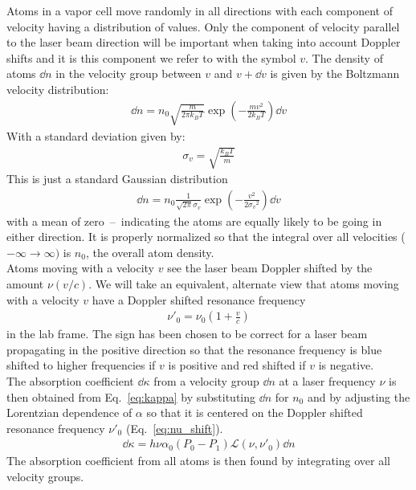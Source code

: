 Atoms in a vapor cell move randomly in all directions with each component of velocity having a distribution
of values. Only the component of velocity parallel to the laser beam direction will be important when taking
into account Doppler shifts and it is this component we refer to with the symbol \(v \). The density of atoms
\(\dd n \) in the velocity group between \(v \) and \(v+\dd v \) is given by the Boltzmann velocity
distribution:
\begin{align}
    \dd n = n_0 \sqrt{ \frac{m}{2\pi k_B T} } \exp{ \left( -\frac{mv^2}{2 k_B T} \right ) } \dd v
\end{align}
With a standard deviation given by:
\begin{align}
    \sigma_v = \sqrt{\frac{k_B T}{m}}
\end{align}
This is just a standard Gaussian distribution
\begin{align}
    \dd n = n_0 \frac{1}{\sqrt{2\pi}\sigma_v}  \exp{ \left( -\frac{v^2}{2 {\sigma_v}^2} \right ) } \dd v
\end{align}
with a mean of zero~--~indicating the atoms are equally likely to be going in either direction. It is properly
normalized so that the integral over all velocities (\(-\infty \rightarrow \infty) \) is \(n_0 \), the overall
atom density. \\
Atoms moving with a velocity \(v \) see the laser beam Doppler shifted by the amount \(\nu(v/c) \). We will
take an equivalent, alternate view that atoms moving with a velocity \(v \) have a Doppler shifted resonance
frequency
\begin{align}\label{eq:nu_shift}
    \nu'_0 = \nu_0 \left ( 1 + \frac{v}{c} \right)
\end{align}
in the lab frame. The sign has been chosen to be correct for a laser beam propagating in the positive direction
so that the resonance frequency is blue shifted to higher frequencies if \(v \) is positive and red shifted if
\(v \) is negative.\\
The absorption coefficient \(\dd\kappa \) from a velocity group \(\dd n \) at a laser frequency 
\(\nu \) is then obtained from Eq.~\ref{eq:kappa} by substituting \(\dd n \) for \(n_0 \) and by adjusting
the Lorentzian dependence of \(\alpha \) so that it is centered on the Doppler shifted resonance frequency
\(\nu'_0 \) (Eq.~\ref{eq:nu_shift}).
\begin{align}
    \dd\kappa = h\nu \alpha_0(P_0-P_1) \mathcal{L}(\nu,\nu'_0) \dd n
\end{align}
The absorption coefficient from all atoms is then found by integrating over all velocity groups.

